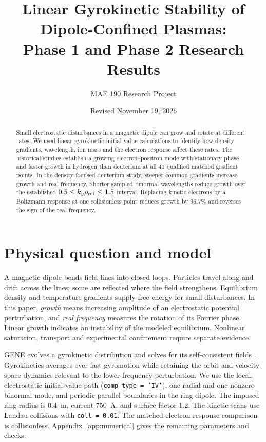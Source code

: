 \documentclass[11pt,letterpaper]{article}
\title{Linear Gyrokinetic Stability of Dipole-Confined Plasmas:\\[4pt] Phase 1 and Phase 2 Research Results}
\author{MAE 190 Research Project}
\date{Revised November 19, 2026}
\newcommand{\kn}{k_y\rho_{\rm ref}}
\begin{document}
\maketitle
\begin{abstract}
Small electrostatic disturbances in a magnetic dipole can grow and rotate at different rates. We used linear gyrokinetic initial-value calculations to identify how density gradients, wavelength, ion mass and the electron response affect these rates. The historical studies establish a growing electron--positron mode with stationary phase and faster growth in hydrogen than deuterium at all 41 qualified matched gradient points. In the density-focused deuterium study, steeper common gradients increase growth and real frequency. Shorter sampled binormal wavelengths reduce growth over the established $0.5\leq\kn\leq1.5$ interval. Replacing kinetic electrons by a Boltzmann response at one collisionless point reduces growth by 96.7\% and reverses the sign of the real frequency. \FollowupAbstract
\end{abstract}

\section{Physical question and model}
A magnetic dipole bends field lines into closed loops. Particles travel along and drift across the lines; some are reflected where the field strengthens. Equilibrium density and temperature gradients supply free energy for small disturbances. In this paper, \emph{growth} means increasing amplitude of an electrostatic potential perturbation, and \emph{real frequency} measures the rotation of its Fourier phase. Linear growth indicates an instability of the modeled equilibrium. Nonlinear saturation, transport and experimental confinement require separate evidence.

GENE evolves a gyrokinetic distribution and solves for its self-consistent fields \cite{jenko2000,goerler2011}. Gyrokinetics averages over fast gyromotion while retaining the orbit and velocity-space dynamics relevant to the lower-frequency perturbation. We use the local, electrostatic initial-value path (\texttt{comp\_type = 'IV'}), one radial and one nonzero binormal mode, and periodic parallel boundaries in the ring dipole. The imposed ring radius is \SI{0.4}{\meter}, current \SI{750}{\ampere}, and surface factor 1.2. The kinetic scans use Landau collisions with \texttt{coll = 0.01}. The matched electron-response comparison is collisionless. Appendix~\ref{app:numerical} gives the remaining parameters and checks.
\end{document}

